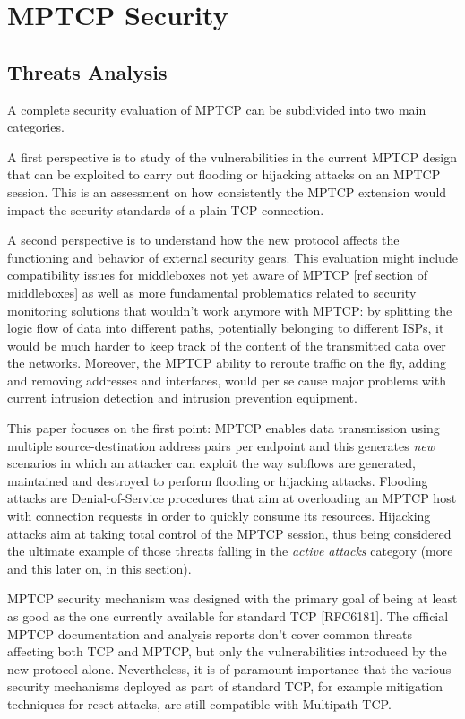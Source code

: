 \chapter{MPTCP Security}
\label{chap:mptcpsecurity}

\section{Threats Analysis}
A complete security evaluation of MPTCP can be subdivided into two main categories. 


A first perspective is to study of the vulnerabilities in the current MPTCP design that can be exploited to carry out flooding or hijacking attacks on an MPTCP session. This is an assessment on how consistently the MPTCP extension would impact the security standards of a plain TCP connection.


A second perspective is to understand how the new protocol affects the functioning and behavior of external security gears. This evaluation might include compatibility issues for middleboxes not yet aware of MPTCP [ref section of middleboxes] as well as more fundamental problematics related to security monitoring solutions that wouldn't work anymore with MPTCP: by splitting the logic flow of data into different paths, potentially belonging to different ISPs, it would be much harder to keep track of the content of the transmitted data over the networks. Moreover, the MPTCP ability to reroute traffic on the fly, adding and removing addresses and interfaces, would per se cause major problems with current intrusion detection and intrusion prevention equipment.


This paper focuses on the first point: MPTCP enables data transmission using multiple source-destination address pairs per endpoint and this generates \textit{new} scenarios in which an attacker can exploit the way subflows are generated, maintained and destroyed to perform flooding or hijacking attacks. 
Flooding attacks are Denial-of-Service procedures that aim at overloading an MPTCP host with connection requests in order to quickly consume its resources.
Hijacking attacks aim at taking total control of the MPTCP session, thus being considered the ultimate example of those threats falling in the \textit{active attacks} category (more and this later on, in this section).


MPTCP security mechanism was designed with the primary goal of being at least as good as the one currently available for standard TCP [RFC6181]. The official MPTCP documentation and analysis reports don't cover common threats affecting both TCP and MPTCP, but only the vulnerabilities introduced by the new protocol alone. Nevertheless, it is of paramount importance that the various security mechanisms deployed as part of standard TCP, for example mitigation techniques for reset attacks, are still compatible with Multipath TCP.

